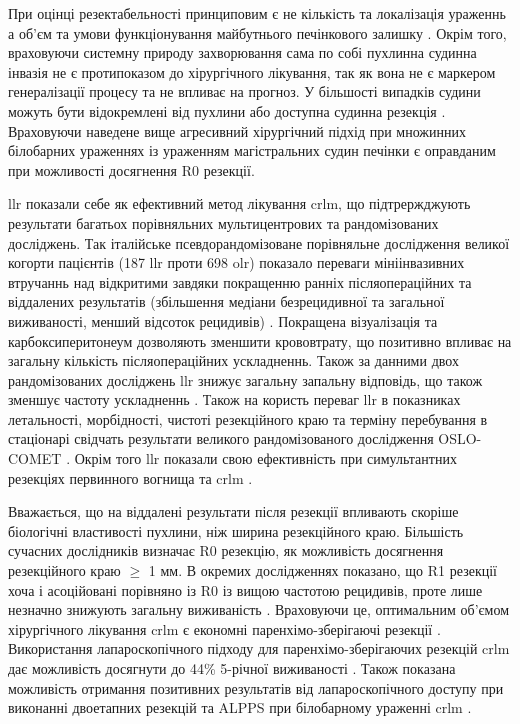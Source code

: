 \begin{refsection}
При оцінці резектабельності принциповим є не кількість та локалізація ураженнь а об'єм та умови функціонування майбутнього печінкового залишку \cite{Allard2017}. Окрім того, враховуючи системну природу захворювання сама по собі пухлинна судинна інвазія не є протипоказом до хірургічного лікування, так як вона не є маркером генералізації процесу та не впливає на прогноз. У більшості випадків судини можуть бути відокремлені від пухлини або доступна судинна резекція \cite{Torzilli2017}. Враховуючи наведене вище агресивний хірургічний підхід при множинних білобарних ураженнях із ураженням магістральних судин печінки є оправданим при можливості досягнення R0 резекції.

\acrshort{llr} показали себе як ефективний метод лікування \acrshort{crlm}, що підтрержджують результати багатьох порівняльних мультицентрових та рандомізованих досліджень. Так італійське псевдорандомізоване порівняльне дослідження великої когорти пацієнтів (187 \acrshort{llr} проти 698 \acrshort{olr})  показало переваги мініінвазивних втручаннь над відкритими завдяки покращенню ранніх післяопераційних та віддалених результатів (збільшення медіани безрецидивної та загальної виживаності, менший відсоток рецидивів) \cite{Ratti2018a}. Покращена візуалізація та карбоксиперитонеум дозволяють зменшити крововтрату, що позитивно впливає на загальну кількість післяопераційних ускладненнь. Також за данними двох рандомізованих досліджень \acrshort{llr} знижує загальну запальну відповідь, що також зменшує частоту ускладненнь \cite{Kasai2018, Fretland2015}. Також на користь переваг \acrshort{llr} в показниках летальності, морбідності, чистоті резекційного краю та терміну перебування в стаціонарі свідчать результати великого рандомізованого дослідження OSLO-COMET \cite{Fretland2018a}. Окрім того \acrshort{llr} показали свою ефективність при симультантних резекціях первинного вогнища та \acrshort{crlm} \cite{Moris2019}.

Вважається, що на віддалені результати після резекції впливають скоріше біологічні властивості пухлини, ніж ширина резекційного краю. Більшість сучасних дослідників визначає R0 резекцію, як можливість досягнення резекційного краю $\geq$ 1 мм. В окремих дослідженнях показано, що R1 резекції хоча і асоційовані порівняно із R0 із вищою частотою рецидивів, проте лише незначно знижують загальну виживаність \cite{DeHaas2008}. Враховуючи це, оптимальним об'ємом хірургічного лікування \acrshort{crlm} є економні паренхімо-зберігаючі резекції \cite{Matsumura2016, Moris2017}. Використання лапароскопічного підходу для паренхімо-зберігаючих резекцій \acrshort{crlm} дає можливість досягнути до 44\% 5-річної виживаності \cite{Aghayan2018}. Також показана можливість отримання позитивних результатів від лапароскопічного доступу при виконанні двоетапних резекцій та \acrshort{ALPPS} при білобарному ураженні \acrshort{crlm} \cite{Okumura2019, Melandro2019}.


\end{refsection}
